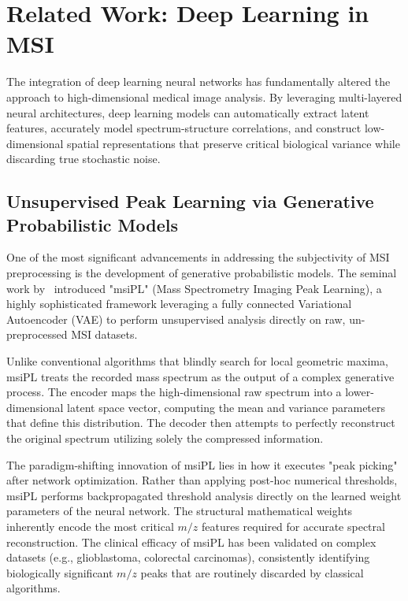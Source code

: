 \documentclass[
12pt, %
oneside, %
english, %
onehalfspacing, %
nolistspacing, %
headsepline, %
]{MastersDoctoralThesis} %
\begin{document}
\section{Related Work: Deep Learning in MSI}

The integration of deep learning neural networks has fundamentally altered the approach to high-dimensional medical image analysis. By leveraging multi-layered neural architectures, deep learning models can automatically extract latent features, accurately model spectrum-structure correlations, and construct low-dimensional spatial representations that preserve critical biological variance while discarding true stochastic noise.

\subsection*{Unsupervised Peak Learning via Generative Probabilistic Models}

One of the most significant advancements in addressing the subjectivity of MSI preprocessing is the development of generative probabilistic models. The seminal work by~\citet{abdelmoula2021peak} introduced "msiPL" (Mass Spectrometry Imaging Peak Learning), a highly sophisticated framework leveraging a fully connected Variational Autoencoder (VAE) to perform unsupervised analysis directly on raw, un-preprocessed MSI datasets.

Unlike conventional algorithms that blindly search for local geometric maxima, msiPL treats the recorded mass spectrum as the output of a complex generative process. The encoder maps the high-dimensional raw spectrum into a lower-dimensional latent space vector, computing the mean and variance parameters that define this distribution. The decoder then attempts to perfectly reconstruct the original spectrum utilizing solely the compressed information.

The paradigm-shifting innovation of msiPL lies in how it executes "peak picking" after network optimization. Rather than applying post-hoc numerical thresholds, msiPL performs backpropagated threshold analysis directly on the learned weight parameters of the neural network. The structural mathematical weights inherently encode the most critical $m/z$ features required for accurate spectral reconstruction. The clinical efficacy of msiPL has been validated on complex datasets (e.g., glioblastoma, colorectal carcinomas), consistently identifying biologically significant $m/z$ peaks that are routinely discarded by classical algorithms. \citep{abdelmoula2021peak, abdelmoula2022massnet}
\end{document}
